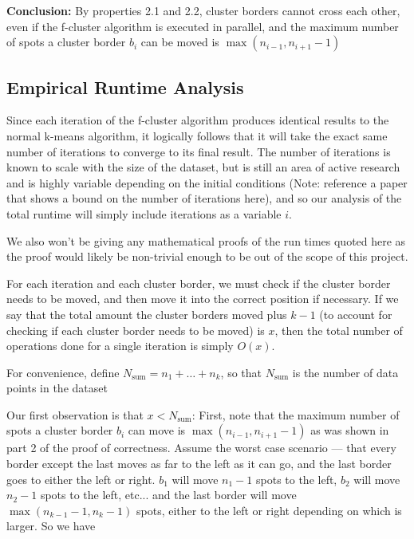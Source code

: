 \documentclass[conference,compsoc]{IEEEtran}
\begin{document}
\textbf{Conclusion:}
By properties 2.1 and 2.2, cluster borders cannot cross each other, even if the f-cluster algorithm is executed in parallel, and the maximum number of spots a cluster border $b_i$ can be moved is $\max(n_{i-1}, n_{i+1}-1)$

\subsection{Empirical Runtime Analysis}
Since each iteration of the f-cluster algorithm produces identical results to the normal k-means algorithm,
it logically follows that it will take the exact same number of iterations to converge to its final result.
The number of iterations is known to scale with the size of the dataset,
 but is still an area of active research and is highly variable depending on the initial conditions
 (Note: reference a paper that shows a bound on the number of iterations here),
 and so our analysis of the total runtime will simply include iterations as a variable $i$. 
 \par

We also won’t be giving any mathematical proofs of the run times quoted here as the proof would likely be non-trivial enough to be out of the scope of this project.
\par

For each iteration and each cluster border, we must check if the cluster border needs to be moved, and then move it into the correct position if necessary.
If we say that the total amount the cluster borders moved plus $k-1$ (to account for checking if each cluster border needs to be moved) is $x$,
then the total number of operations done for a single iteration is simply $O(x)$.

For convenience, define $N_\text{sum} = n_1 + \dots + n_k$, so that $N_\text{sum}$ is the number of data points in the dataset

Our first observation is that $x < N_\text{sum}$:
First, note that the maximum number of spots a cluster border $b_i$ can move is $\max(n_{i-1}, n_{i+1}-1)$ as was shown in part 2 of the proof of correctness.
Assume the worst case scenario — that every border except the last moves as far to the left as it can go,
and the last border goes to either the left or right. $b_1$ will move $n_1-1$ spots to the left, $b_2$ will move $n_2-1$ spots to the left, etc... and the last border will move $\max(n_{k-1}-1, n_k-1)$ spots, either to the left or right depending on which is larger.
So we have 
\end{document}
